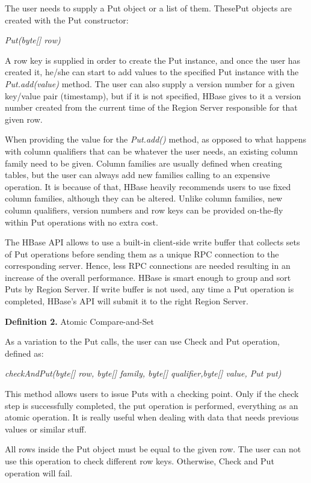 The user needs to supply a Put object or a list of them. ThesePut objects are created with the Put constructor:
\par
\bigskip
\centerline{\textit{Put(byte[] row)}}
\bigskip
A row key is supplied in order to create the Put instance, and once the user has created it, he/she can start to add values to the specified Put instance with the \textit{Put.add(value)} method. The user can also supply a version number for a given key/value pair (timestamp), but if it is not specified, HBase gives to it a version number created from the current time of the Region Server responsible for that given row.
\par
When providing the value for the \textit{Put.add()} method, as opposed to what happens with column qualifiers that can be whatever the user needs, an existing column family need to be given. Column families are usually defined when creating tables, but the user can always add new families calling to an expensive operation. It is because of that, HBase heavily recommends users to use fixed column families, although they can be altered.
Unlike column families, new column qualifiers, version numbers and row keys can be provided on-the-fly within Put operations with no extra cost.
\par
The HBase API allows to use a built-in client-side write buffer that collects sets of Put operations before sending them as a unique RPC connection to the corresponding server. Hence, less RPC connections are needed resulting in an increase of the overall performance. HBase is smart enough to group and sort Puts by Region Server. If write buffer is not used,  any time a Put operation is completed, HBase's API will submit it to the right Region Server.

\bigskip
\textbf{Definition 2. }Atomic Compare-and-Set

As a variation to the Put calls, the user can use Check and Put operation, defined as:
\par
\bigskip
\centerline{\textit{checkAndPut(byte[] row, byte[] family, byte[] qualifier,byte[] value, Put put)}}
\bigskip
This method allows users to issue Puts with a checking point. Only if the check step is successfully completed, the put operation is performed, everything as an atomic operation. It is really useful when dealing with data that needs previous values or similar stuff.
\par
All rows inside the Put object must be equal to the given row. The user can not use this operation to check different row keys. Otherwise, Check and Put operation will fail.

